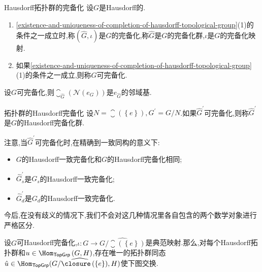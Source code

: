 \begin{definition}{Hausdorff拓扑群的完备化}{}
	设$G$是Hausdorff的.
	\begin{enumerate}
		\item \cref{existence-and-uniqueness-of-completion-of-hausdorff-topological-group}(1)的条件之一成立时,称$(\hat{G},\iota)$是$G$的完备化,称$\hat{G}$是$G$的完备化群,$\iota$是$G$的完备化映射.
		\item 如果\cref{existence-and-uniqueness-of-completion-of-hausdorff-topological-group}(1)的条件之一成立,则称$G$可完备化.
	\end{enumerate}
\end{definition}

\begin{proposition}{}{}
	设$G$可完备化,则$\closure_{\hat{G}}\left(\mathcal{N}\left(e_{G}\right)\right)$是$e_{\hat{G}}$的邻域基.
\end{proposition}

\begin{definition}{拓扑群的Hausdorff完备化}{}
	设$N=\closure\left(\left\{e\right\}\right),G^{\prime}=G/N$.如果$\hat{G}^{\prime}$可完备化,则称$\hat{G}^{\prime}$是$G$的Hausdorff完备化群.
\end{definition}

\begin{convention}{}{}
	注意,当$\hat{G}^{\prime}$可完备化时,在精确到一致同构的意义下:
	\begin{itemize}
		\item $G$的Hausdorff一致完备化和$G$的Hausdorff完备化相同;
		\item $\hat{G}_{s}^{\prime}$是$G_{s}$的Hausdorff一致完备化;
		\item $\hat{G}_{d}^{\prime}$是$G_{d}$的Hausdorff一致完备化.
	\end{itemize}
	今后,在没有歧义的情况下,我们不会对这几种情况里各自包含的两个数学对象进行严格区分.
\end{convention}

\begin{proposition}{}{}
	设$G$可Hausdorff完备化,$\iota:G\to\widehat{G/\closure\left(\left\{e\right\}\right)}$是典范映射.那么,对每个Hausdorff拓扑群和$u\in\Hom_{\mathsf{TopGrp}}\left(G,H\right)$,存在唯一的拓扑群同态$\hat{u}\in\Hom_{\mathsf{TopGrp}}(\widehat{G/\closure\left(\left\{e\right\}\right)},H)$使下图交换.
	\begin{center}
	\end{center}
\end{proposition}


